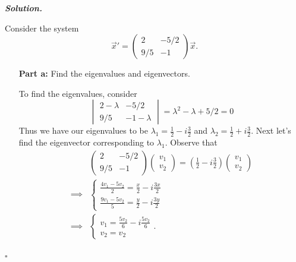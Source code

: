 \documentclass[12pt]{report}
\newenvironment{solution}[1][\it{Solution}]{\textbf{#1. } }{$\square$}
\newcommand{\paren}[1]{{\left(#1\right)}} %
\begin{document}
\begin{solution}

    
    \noindent
    Consider the system
    \[ \vec{x}' = \begin{pmatrix}
        2 & -5/2\\
        9/5 & -1
    \end{pmatrix}\vec{x}.\]
    \begin{enumerate}
        \item [{\bf Part a:}] Find the eigenvalues and eigenvectors.
        
        \noindent
        To find the eigenvalues, consider
        \[
            \begin{vmatrix}
                2 - \lambda & -5/2\\
                9/5 & -1 - \lambda
            \end{vmatrix} = \lambda^2 - \lambda + 5/2 = 0
        \]
        Thus we have our eigenvalues to be $\lambda_1 = \frac{1}{2} - i\frac{3}{2}$ and $\lambda_2 = \frac{1}{2} + i\frac{3}{2}$. Next let's find the eigenvector corresponding to $\lambda_1$. Observe that
        \begin{align*}
            &\begin{pmatrix}
                2 & -5/2\\
                9/5 & -1
            \end{pmatrix}\begin{pmatrix}
                v_1\\
                v_2
            \end{pmatrix} = \paren{\frac{1}{2} - i\frac{3}{2}} \begin{pmatrix}
                v_1\\
                v_2
            \end{pmatrix}\\
            \implies & \begin{cases}
                \frac{4v_1 - 5v_2}{2} = \frac{x}{2} - i\frac{3x}{2}\\
                \frac{9v_1 - 5v_2}{5} = \frac{y}{2} - i\frac{3y}{2}
            \end{cases}\\
            \implies &\begin{cases}
                v_1 = \frac{5v_2}{6} - i\frac{5v_2}{6}\\
                v_2 = v_2
            \end{cases}.
        \end{align*}

\end{enumerate}
\end{solution}
\end{document}
